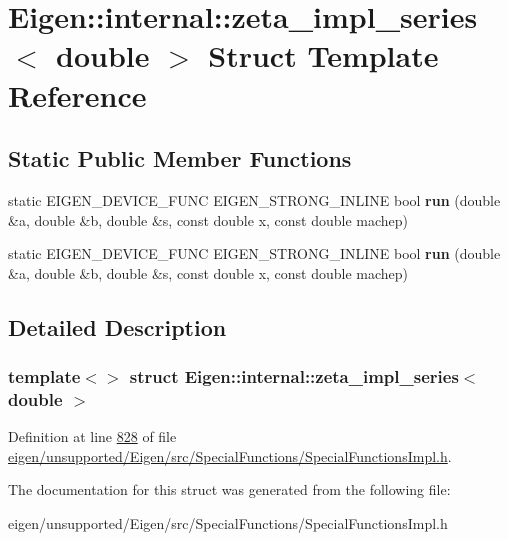 \hypertarget{struct_eigen_1_1internal_1_1zeta__impl__series_3_01double_01_4}{}\section{Eigen\+:\+:internal\+:\+:zeta\+\_\+impl\+\_\+series$<$ double $>$ Struct Template Reference}
\label{struct_eigen_1_1internal_1_1zeta__impl__series_3_01double_01_4}
\subsection*{Static Public Member Functions}
\begin{DoxyCompactItemize}
\item 
\mbox{\label{struct_eigen_1_1internal_1_1zeta__impl__series_3_01double_01_4_acaecb3d80b05329ad8401c61c0c12cc9}} 
static E\+I\+G\+E\+N\+\_\+\+D\+E\+V\+I\+C\+E\+\_\+\+F\+U\+NC E\+I\+G\+E\+N\+\_\+\+S\+T\+R\+O\+N\+G\+\_\+\+I\+N\+L\+I\+NE bool {\bfseries run} (double \&a, double \&b, double \&s, const double x, const double machep)
\item 
\mbox{\label{struct_eigen_1_1internal_1_1zeta__impl__series_3_01double_01_4_acaecb3d80b05329ad8401c61c0c12cc9}} 
static E\+I\+G\+E\+N\+\_\+\+D\+E\+V\+I\+C\+E\+\_\+\+F\+U\+NC E\+I\+G\+E\+N\+\_\+\+S\+T\+R\+O\+N\+G\+\_\+\+I\+N\+L\+I\+NE bool {\bfseries run} (double \&a, double \&b, double \&s, const double x, const double machep)
\end{DoxyCompactItemize}


\subsection{Detailed Description}
\subsubsection*{template$<$$>$\newline
struct Eigen\+::internal\+::zeta\+\_\+impl\+\_\+series$<$ double $>$}



Definition at line \hyperlink{eigen_2unsupported_2_eigen_2src_2_special_functions_2_special_functions_impl_8h_source_l00828}{828} of file \hyperlink{eigen_2unsupported_2_eigen_2src_2_special_functions_2_special_functions_impl_8h_source}{eigen/unsupported/\+Eigen/src/\+Special\+Functions/\+Special\+Functions\+Impl.\+h}.



The documentation for this struct was generated from the following file\+:\begin{DoxyCompactItemize}
\item 
eigen/unsupported/\+Eigen/src/\+Special\+Functions/\+Special\+Functions\+Impl.\+h\end{DoxyCompactItemize}
